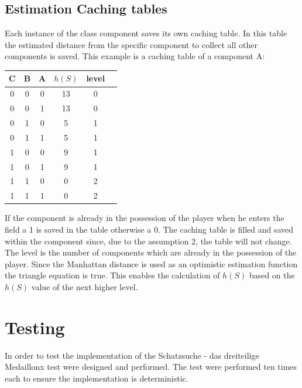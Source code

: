 \documentclass{article}
\newcommand{\problem}{Schatzsuche - das dreiteilige Medaillon}
\begin{document}
\subsection{Estimation Caching tables} \label{estimation_caching_tables}
Each instance of the class component saves its own caching table. In this table the estimated distance from the specific component to collect all other components is saved. This example is a caching table of a component A:\\
\begin{center}
\begin{tabular}{ |c|c|c|c|c|c| } 
 \hline
 C & B & A & $h(S)$ & level \\ 
 \hline
 0 & 0 & 0 & 13 & 0 \\ 
 0 & 0 & 1 & 13 & 0 \\ 
 0 & 1 & 0 & 5 & 1 \\ 
 0 & 1 & 1 & 5 & 1 \\ 
 1 & 0 & 0 & 9 & 1 \\ 
 1 & 0 & 1 & 9 & 1 \\ 
 1 & 1 & 0 & 0 & 2 \\ 
 1 & 1 & 1 & 0 & 2 \\ 
 \hline
\end{tabular}
\label{tab:caching table}
\end{center}
If the component is already in the possession of the player when he enters the field a 1 is saved in the table otherwise a 0. 
The caching table is filled and saved within the component since, due to the assumption 2, the table will not change. 
The level is the number of components which are already in the possession of the player. 
Since the Manhattan distance is used as an optimistic estimation function the triangle equation is true. This enables the calculation of $h(S)$ based on the $h(S)$ value of the next higher level.


\section{Testing}
In order to test the implementation of the \problem x test were designed and performed. The test were performed ten times each to ensure the implementation is deterministic. 
\end{document}
